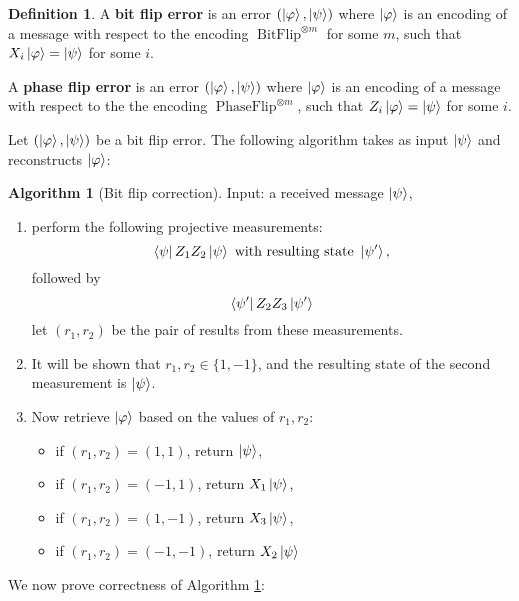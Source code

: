 \documentclass[12pt]{article}
\theoremstyle{plain}
\theoremstyle{definition}
\newtheorem{defn}[thm]{Definition} %
\newtheorem{algorithm}[thm]{Algorithm}
\begin{document}
\begin{defn}
	A \textbf{bit flip error} is an error $(\ket{\varphi},\ket{\psi})$ where $\ket{\varphi}$ is an encoding of a message with respect to the encoding $\operatorname{BitFlip}^{\otimes m}$ for some $m$, such that $X_i\ket{\varphi} =\ket{\psi}$ for some $i$.
	
	A \textbf{phase flip error} is an error $(\ket{\varphi},\ket{\psi})$ where $\ket{\varphi}$ is an encoding of a message with respect to the the encoding $\operatorname{PhaseFlip}^{\otimes m}$, such that $Z_i\ket{\varphi} =\ket{\psi}$ for some $i$.
\end{defn}
Let $(\ket{\varphi},\ket{\psi})$ be a bit flip error.  The following algorithm takes as input $\ket{\psi}$ and reconstructs $\ket{\varphi}$:
\begin{algorithm}[Bit flip correction]\label{alg:bit_flip_correction}
	Input: a received message $\ket{\psi}$,
	\begin{enumerate}
		\item perform the following projective measurements:
		\begin{equation}
			\bra{\psi} Z_1 Z_2 \ket{\psi}\text{ with resulting state }\ket{\psi'},
		\end{equation}
		followed by
		\begin{equation}
			\bra{\psi'} Z_2 Z_3 \ket{\psi'}
		\end{equation}
		let $(r_1,r_2)$ be the pair of results from these measurements.
		\item It will be shown that $r_1,r_2 \in \lbrace 1,-1\rbrace$, and the resulting state of the second measurement is $\ket{\psi}$.
		\item Now retrieve $\ket{\varphi}$ based on the values of $r_1,r_2$:
		\begin{itemize}
			\item if $(r_1, r_2) = (1,1)$, return $\ket{\psi}$,
			\item if $(r_1,r_2) = (-1,1)$, return $X_1 \ket{\psi}$,
			\item if $(r_1,r_2) = (1,-1)$, return $X_3 \ket{\psi}$,
			\item if $(r_1,r_2) = (-1,-1)$, return $X_2 \ket{\psi}$
		\end{itemize}
	\end{enumerate}
\end{algorithm}
We now prove correctness of Algorithm \ref{alg:bit_flip_correction}:
\end{document}
